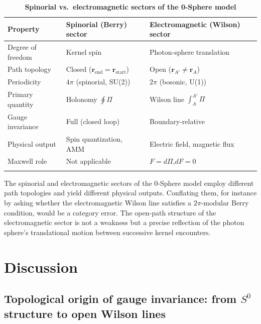 \documentclass[%
 reprint, amsmath,amssymb, aps, prb, ]{revtex4-2}
\numberwithin{equation}{section}
\begin{document}
\begin{table}[t!]
\centering
\caption{\textbf{Spinorial vs.\ electromagnetic sectors of the 0-Sphere model}}
\label{tab:sectors}
\renewcommand{\arraystretch}{1.4}
\begin{tabular}{p{4.5cm}p{5.5cm}p{5.5cm}}
\toprule
\textbf{Property} & \textbf{Spinorial (Berry) sector} & \textbf{Electromagnetic (Wilson) sector} \\
\midrule
Degree of freedom
& Kernel spin
& Photon-sphere translation \\
\addlinespace[0.3cm]
Path topology
& Closed ($\mathbf{r}_{\text{end}}=\mathbf{r}_{\text{start}}$)
& Open ($\mathbf{r}_{A'}\neq\mathbf{r}_A$) \\
\addlinespace[0.3cm]
Periodicity
& $4\pi$ (spinorial, SU(2))
& $2\pi$ (bosonic, U(1)) \\
\addlinespace[0.3cm]
Primary quantity
& Holonomy $\oint\Pi$
& Wilson line $\int_A^{A'}\Pi$ \\
\addlinespace[0.3cm]
Gauge invariance
& Full (closed loop)
& Boundary-relative \\
\addlinespace[0.3cm]
Physical output
& Spin quantization, AMM
& Electric field, magnetic flux \\
\addlinespace[0.3cm]
Maxwell role
& Not applicable
& $F=d\Pi$,\quad $dF=0$ \\
\addlinespace[0.2cm]
\bottomrule
\end{tabular}
\vspace{0.2cm}
\begin{minipage}{0.95\textwidth}
\justifying\footnotesize
The spinorial and electromagnetic sectors of the 0-Sphere model employ different path topologies and yield different physical outputs. Conflating them, for instance by asking whether the electromagnetic Wilson line satisfies a $2\pi$-modular Berry condition, would be a category error. The open-path structure of the electromagnetic sector is not a weakness but a precise reflection of the photon sphere's translational motion between successive kernel encounters.
\end{minipage}
\end{table}

\section{Discussion}
\label{sec:discuss}

\subsection{Topological origin of gauge invariance: from $S^0$ structure to open Wilson lines}
\label{sec:topogauge}
\end{document}
